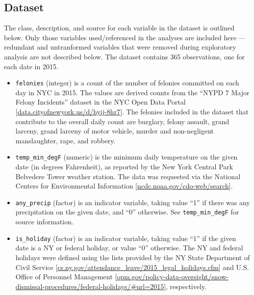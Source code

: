 \documentclass[11pt,notitlepage]{article}
\begin{document}
\subsection{Dataset}
\label{sec:dataset}

The class, description, and source for each variable in the dataset is outlined below. Only those variables used/referenced in the analyses are included here --- redundant and untranformed variables that were removed during exploratory analysis are not described below. The dataset contains 365 observations, one for each date in 2015.

\begin{itemize}
\setlength\itemsep{-1pt}

\item \texttt{felonies} (integer) is a count of the number of felonies committed on each day in NYC in 2015. The values are derived counts from the ``NYPD 7 Major Felony Incidents'' dataset in the NYC Open Data Portal [\href{https://data.cityofnewyork.us/Public-Safety/NYPD-7-Major-Felony-Incidents/hyij-8hr7}{data.cityofnewyork.us/d/hyij-8hr7}]. The felonies included in the dataset that contribute to the overall daily count are burglary, felony assault, grand larceny, grand larceny of motor vehicle, murder and non-negligent manslaughter, rape, and robbery.

\item \texttt{temp_min_degF} (numeric) is the minimum daily temperature on the given date (in degrees Fahrenheit), as reported by the New York Central Park Belvedere Tower weather station. The data was requested via the National Centers for Environmental Information [\href{http://www.ncdc.noaa.gov/cdo-web/search}{ncdc.noaa.gov/cdo-web/search}].


\item \texttt{any_precip} (factor) is an indicator variable, taking value ``1'' if there was any precipitation on the given date, and ``0'' otherwise. See \texttt{temp_min_degF} for source information.


\item \texttt{is_holiday} (factor) is an indicator variable, taking value ``1'' if the given date is a NY or federal holiday, or value ``0'' otherwise. The NY and federal holidays were defined using the lists provided by the NY State Department of Civil Service [\href{https://www.cs.ny.gov/attendance_leave/2015_legal_holidays.cfm}{cs.ny.gov/attendance_leave/2015_legal_holidays.cfm}] and U.S. Office of Personnel Management [\href{https://www.opm.gov/policy-data-oversight/snow-dismissal-procedures/federal-holidays/\#url=2015}{opm.gov/policy-data-oversight/snow-dismissal-procedures/federal-holidays/\#url=2015}], respectively.



\end{itemize}
\end{document}
